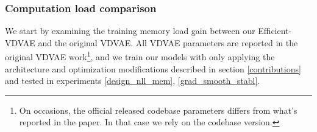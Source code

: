 \documentclass{article}
\begin{document}
\subsubsection{Computation load comparison}
We start by examining the training memory load gain between our Efficient-VDVAE and the original VDVAE. All VDVAE parameters are reported in the original VDVAE work\footnote{On occasions, the official released codebase parameters differs from what's reported in the paper. In that case we rely on the codebase version.}, and we train our models with only applying the architecture and optimization modifications described in section \ref{contributions} and tested in experiments \ref{design_nll_mem}, \ref{grad_smooth_stabl}.

\begin{table}[]
\centering
\caption{\textbf{Computational load comparison}. We train  configurations of Efficient-VDVAE, derived from the VDVAE baseline by only modifying the hyper-parameters described in section \ref{contributions}. We report the convergence speed as measured in number of iterations and clock time (in hours). We also report the total training memory load of each model and their NLL at convergence time. The configuration C1 is only different from C2 in the use of incremental filter width (experiment of table \ref{width_table}). A south-east arrow () denotes the use of cosine decay. More detailed model hyper-parameters are available in table \ref{layer_dist} and the \href{https://github.com/Rayhane-mamah/Efficient-VDVAE}{source code}.}
\vskip 0.1in
\end{table}
\end{document}
